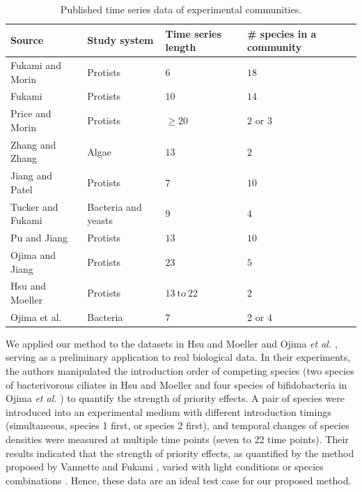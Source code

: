 \documentclass[12pt, class=article, crop=false]{standalone}
\begin{document}
\begin{table}
    \flushleft
    \caption{Published time series data of experimental communities.}
    \begin{tabular}{llll}
         Source & Study system & Time series length & \# species in a community\\
         \hline
         Fukami and Morin \citep{fukami_productivity-biodiversity_2003} & Protists & $6$ & $18$\\
         Fukami \citep{fukami_assembly_2004} & Protists & $10$ & $14$\\
         Price and Morin \citep{price_colonization_2004} & Protists & $\ge 20$ & $2$ or $3$ \\
         Zhang and Zhang \citep{zhang_colonization_2007} & Algae & $13$ & $2$\\
         Jiang and Patel \citep{jiang_community_2008} & Protists & $7$ & $10$\\
         Tucker and Fukami \citep{tucker_environmental_2014} & Bacteria and yeasts & $9$ & $4$\\
         Pu and Jiang \citep{pu_dispersal_2015} & Protists & $13$ & $10$\\
         Ojima and Jiang \citep{ojima_interactive_2017} & Protists & $23$ & $5$\\
         Hsu and Moeller \citep{hsu_metabolic_2021} & Protists & $13~\mbox{to}~22$ & $2$\\
         Ojima et al. \citep{ojima_priority_2022} & Bacteria & $7$ & $2$ or $4$\\
         \hline
    \end{tabular}
    \label{tab:expdata}
\end{table}

We applied our method to the datasets in Hsu and Moeller \citep{hsu_metabolic_2021} and Ojima \textit{et al.} \citep{ojima_priority_2022}, serving as a preliminary application to real biological data.
In their experiments, the authors manipulated the introduction order of competing species (two species of bacterivorous ciliates in Hsu and Moeller \citep{hsu_metabolic_2021} and four species of bifidobacteria in Ojima \textit{et al.} \citep{ojima_priority_2022}) to quantify the strength of priority effects.
A pair of species were introduced into an experimental medium with different introduction timings (simultaneous, species 1 first, or species 2 first), and temporal changes of species densities were measured at multiple time points (seven to 22 time points).
Their results indicated that the strength of priority effects, as quantified by the method proposed by Vannette and Fukami \citep{vannette_historical_2014}, varied with light conditions \citep{hsu_metabolic_2021} or species combinations \citep{ojima_priority_2022}.
Hence, these data are an ideal test case for our proposed method.
\end{document}
